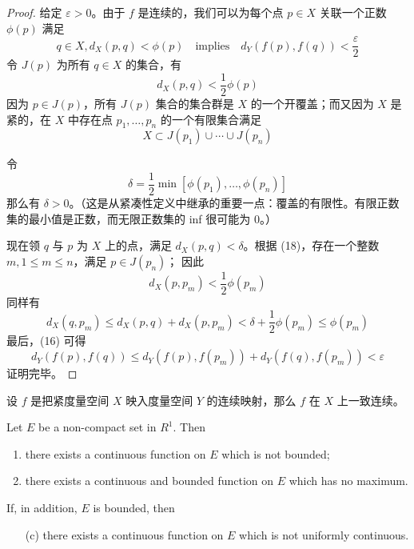 \documentclass[../poma-notes.tex]{subfiles}
\begin{document}
\begin{proof}
  给定 $\varepsilon > 0$。由于 $f$ 是连续的，我们可以为每个点 $p \in X$ 关联一个正数 $\phi(p)$ 满足
  \begin{equation}
    q \in X, d_X(p,q) < \phi(p) \quad \text{implies} \quad d_Y(f(p),f(q)) < \frac{\varepsilon}{2}
  \end{equation}
  令 $J(p)$ 为所有 $q \in X$ 的集合，有
  \begin{equation}
    d_X(p,q) < \frac{1}{2} \phi(p)
  \end{equation}
  因为 $p \in J(p)$，所有 $J(p)$ 集合的集合群是 $X$ 的一个开覆盖；而又因为 $X$ 是紧的，在 $X$ 中存在点 $p_1, \dots, p_n$
  的一个有限集合满足
  \begin{equation}
    X \subset J(p_1) \cup \cdots \cup J(p_n)
  \end{equation}

  令
  \begin{equation}
    \delta = \frac{1}{2} \min [\phi(p_1),\dots,\phi(p_n)]
  \end{equation}
  那么有 $\delta > 0$。（这是从紧凑性定义中继承的重要一点：覆盖的有限性。有限正数集的最小值是正数，而无限正数集的 inf 很可能为 0。）

  现在领 $q$ 与 $p$ 为 $X$ 上的点，满足 $d_X(p,q)<\delta$。根据 (18)，存在一个整数 $m, 1 \le m \le n$，满足 $p \in J(p_n)$；
  因此
  \begin{equation}
    d_X(p, p_m) < \frac{1}{2} \phi(p_m)
  \end{equation}
  同样有
  \[
    d_X(q, p_m) \le d_X(p,q) + d_X(p,p_m) < \delta + \frac{1}{2} \phi(p_m) \le \phi(p_m)
  \]
  最后，(16) 可得
  \[
    d_Y(f(p),f(q)) \le d_Y(f(p),f(p_m)) + d_Y(f(q),f(p_m)) < \varepsilon
  \]
  证明完毕。
\end{proof}

\begin{anote}
  设 $f$ 是把紧度量空间 $X$ 映入度量空间 $Y$ 的连续映射，那么 $f$ 在 $X$ 上一致连续。
\end{anote}

\begin{theorem}
  Let $E$ be a non-compact set in $R^1$. Then
  \begin{enumerate}[label=(\alph*)]
    \item there exists a continuous function on $E$ which is not bounded;
    \item there exists a continuous and bounded function on $E$ which has no maximum.
  \end{enumerate}

  If, in addition, $E$ is bounded, then
  \begin{enumerate}
    \item [(c)] there exists a continuous function on $E$ which is not uniformly continuous.
  \end{enumerate}
\end{theorem}
\end{document}
